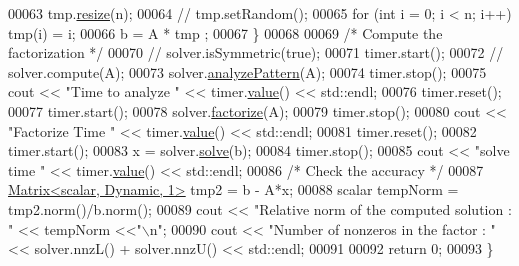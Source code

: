 \begin{DoxyCode}
00063     tmp.\hyperlink{class_eigen_1_1_plain_object_base_a99d9054ee2d5a40c6e00ded0265e9cea}{resize}(n);
00064 \textcolor{comment}{//       tmp.setRandom();}
00065     \textcolor{keywordflow}{for} (\textcolor{keywordtype}{int} i = 0; i < n; i++) tmp(i) = i; 
00066     b = A * tmp ;
00067   \}
00068 
00069   \textcolor{comment}{/* Compute the factorization */}
00070 \textcolor{comment}{//   solver.isSymmetric(true);}
00071   timer.start(); 
00072 \textcolor{comment}{//   solver.compute(A);}
00073   solver.\hyperlink{group___sparse_l_u___module_aa907ff958c4f4855145091d2686f3a8a}{analyzePattern}(A); 
00074   timer.stop(); 
00075   cout << \textcolor{stringliteral}{"Time to analyze "} << timer.\hyperlink{class_eigen_1_1_bench_timer_a26760f963ed8b64c126159bfea57735e}{value}() << std::endl;
00076   timer.reset(); 
00077   timer.start(); 
00078   solver.\hyperlink{group___sparse_l_u___module_a39858b0e72f2659d596364e252b34cbc}{factorize}(A); 
00079   timer.stop(); 
00080   cout << \textcolor{stringliteral}{"Factorize Time "} << timer.\hyperlink{class_eigen_1_1_bench_timer_a26760f963ed8b64c126159bfea57735e}{value}() << std::endl;
00081   timer.reset(); 
00082   timer.start(); 
00083   x = solver.\hyperlink{group___sparse_core___module_a4a66e9498b06e3ec4ec36f06b26d4e8f}{solve}(b);
00084   timer.stop();
00085   cout << \textcolor{stringliteral}{"solve time "} << timer.\hyperlink{class_eigen_1_1_bench_timer_a26760f963ed8b64c126159bfea57735e}{value}() << std::endl; 
00086   \textcolor{comment}{/* Check the accuracy */}
00087   \hyperlink{group___core___module_class_eigen_1_1_matrix}{Matrix<scalar, Dynamic, 1>} tmp2 = b - A*x;
00088   scalar tempNorm = tmp2.norm()/b.norm();
00089   cout << \textcolor{stringliteral}{"Relative norm of the computed solution : "} << tempNorm <<\textcolor{stringliteral}{"\(\backslash\)n"};
00090   cout << \textcolor{stringliteral}{"Number of nonzeros in the factor : "} << solver.nnzL() + solver.nnzU() << std::endl; 
00091   
00092   \textcolor{keywordflow}{return} 0;
00093 \}
\end{DoxyCode}
